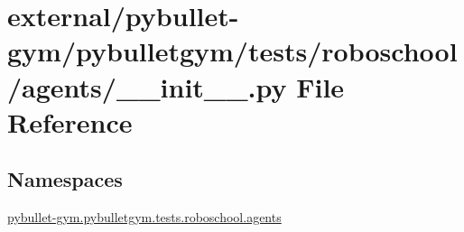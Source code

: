 \hypertarget{external_2pybullet-gym_2pybulletgym_2tests_2roboschool_2agents_2____init_____8py}{}\section{external/pybullet-\/gym/pybulletgym/tests/roboschool/agents/\+\_\+\+\_\+init\+\_\+\+\_\+.py File Reference}
\label{external_2pybullet-gym_2pybulletgym_2tests_2roboschool_2agents_2____init_____8py}
\subsection*{Namespaces}
\begin{DoxyCompactItemize}
\item 
 \hyperlink{namespacepybullet-gym_1_1pybulletgym_1_1tests_1_1roboschool_1_1agents}{pybullet-\/gym.\+pybulletgym.\+tests.\+roboschool.\+agents}
\end{DoxyCompactItemize}
